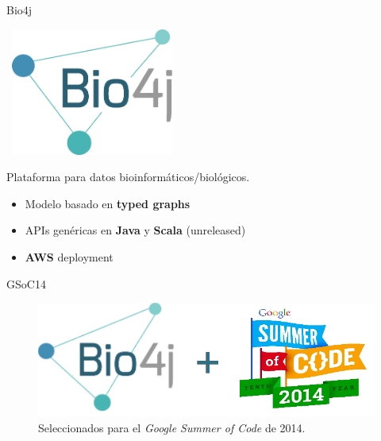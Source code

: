 \documentclass[12pt,compress]{beamer}
\providecommand{\tightlist}{%
\setlength{\itemsep}{0pt}\setlength{\parskip}{0pt}}
\begin{document}
\begin{frame}{Bio4j}

~\includegraphics[width=0.40000\textwidth]{images/bio4j.png}

Plataforma para datos bioinformáticos/biológicos.

\begin{itemize}
\tightlist
\item
  Modelo basado en \textbf{typed graphs}
\item
  APIs genéricas en \textbf{Java} y \textbf{Scala} (unreleased)
\item
  \textbf{AWS} deployment
\end{itemize}

\end{frame}

\begin{frame}{GSoC14}

\begin{figure}[htbp]
\centering
\includegraphics{images/bio4jGsoc.png}
\caption{Seleccionados para el \emph{Google Summer of Code} de 2014.}
\end{figure}

\end{frame}
\end{document}
